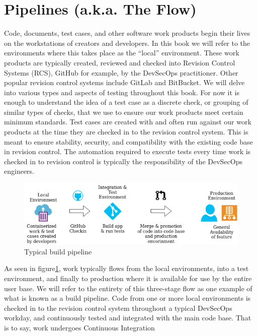 \section{Pipelines (a.k.a. The Flow)}
\justify{}
Code, documents, test cases, and other software work products begin their lives on the
workstations of creators and developers. In this book we will refer to the environments
where this takes place as the ``local'' environment. These work products are typically created,
reviewed and
checked into Revision Control Systems (RCS),
GitHub for example, by the DevSecOps practitioner.
Other popular revision control systems include GitLab and
BitBucket.
\justify{}
We will delve into various types and aspects of testing
throughout this book. For now it is enough to understand the idea of
a test case as a discrete check, or grouping of similar types of
checks, that we use to ensure our work products meet certain minimum
standards.  Test cases are created with and often run against our
work products at the time they are checked in to the revision control
system. This is meant to ensure stability, security, and compatibility
with the existing code base in revision control. The automation required
to execute tests every time work is checked in to revision control is
typically the responsibility of the DevSecOps engineers.
\begin{figure}[!htb]
\centering
\includegraphics[scale=0.63]{../images/flow.png}
\caption{Typical build pipeline}
\label{pipeline}
\end{figure}
\justify{}
As seen in figure\ref{pipeline}, work typically flows from the
local environments, into a test environment, and finally to production
where it is available for use by the entire user base.
\justify{}
We will refer to the entirety of this three-stage flow as one example of
what is known as a build pipeline. Code from one or more local
environments is checked in to the revision control system throughout a
typical DevSecOps workday, and continuously tested and integrated with
the main code base. That is to say, work undergoes Continuous Integration
